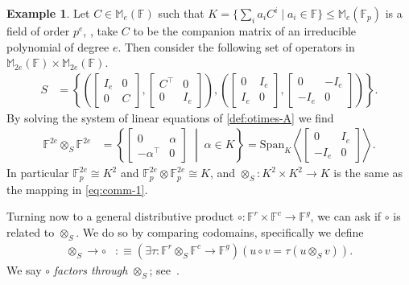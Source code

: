 \documentclass{toc}
\numberwithin{equation}{section}
\theoremstyle{plain}       %
\theoremstyle{remark}
\theoremstyle{definition}
\newtheorem{ex}[equation]{Example}  %
\numberwithin{figure}{section}
\numberwithin{table}{section}
\newcommand{\bbF}{\mathbb{F}}  %
\begin{document}
\begin{ex}\label{ex:tensor-M2}
	Let $C\in \mathbb{M}_e(\bbF)$ such that $K=\{ \sum_i a_i C^i \mid a_i\in
	\bbF\}\leq \mathbb{M}_e(\bbF_p)$ is a field of order $p^e$,  \eg, take $C$
	to be the companion matrix of an irreducible polynomial of degree $e$.  Then
	consider the following set of operators in $\mathbb{M}_{2e}(\bbF)\times
	\mathbb{M}_{2e}(\bbF)$.
	\begin{align*}
		S & =\left\{\left(\begin{bmatrix} I_e & 0\\ 0 & C \end{bmatrix},
			\begin{bmatrix} C^{\top} & 0\\ 0 & I_e \end{bmatrix}\right),
			\left(\begin{bmatrix} 0 & I_e \\ I_e & 0 \end{bmatrix},
			\begin{bmatrix} 0 & -I_e\\ -I_e & 0 \end{bmatrix}\right)\right\}.
	\end{align*}
	By solving the system of linear equations of \eqref{def:otimes-A} we find
	\begin{align*}
		\bbF^{2e}\otimes_S \bbF^{2e}
	& = \left\{\begin{bmatrix} 0 & \alpha\\ -\alpha^{\top} & 0 \end{bmatrix} 
			\;\middle|\; \alpha\in K\right\}= \mathrm{Span}_K\left\langle 
			\begin{bmatrix} 0 & I_e\\ -I_e & 0\end{bmatrix}\right\rangle.
	\end{align*}
	In particular $\bbF_p^{2e}\cong K^2$ and $\bbF_p^{2e}\otimes\bbF_p^{2e}\cong
	K$, and $\otimes_S:K^2\times K^2\to K$ is the same as the mapping in
	\eqref{eq:comm-1}.
\end{ex}

Turning now to a general distributive product $\circ:\bbF^r\times \bbF^c\to
\bbF^g$, we can ask if $\circ$ is related to $\otimes_S$.  We do so by comparing
codomains, specifically we define
\begin{align}\label{def:factor-through}
	\otimes_S \to \circ & :\equiv
	(\exists \tau:\bbF^r\otimes_S \bbF^c\to \bbF^g)( u\circ v= \tau(u\otimes_S v) ).
\end{align}
We say $\circ$ \emph{factors through} $\otimes_S$; 
%
see~\cite[(2.4)]{BW:autotopism}.    %
\end{document}
